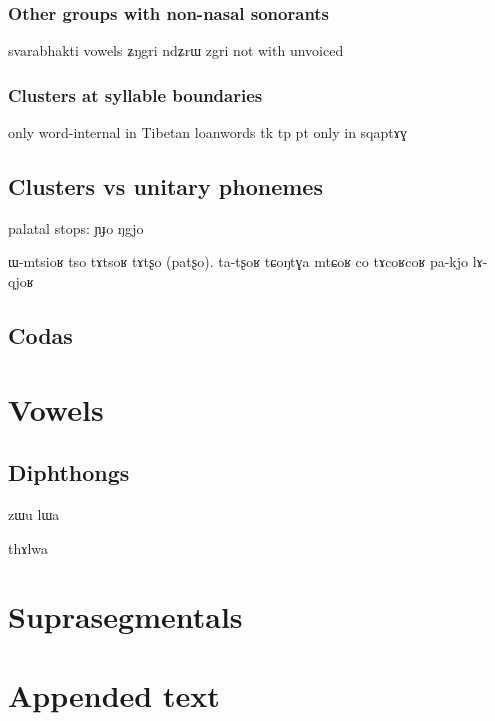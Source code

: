 \documentclass[oldfontcommands,oneside,a4paper,11pt]{article}
\newcommand{\ipa}[1]{{\phon #1}} %
\begin{document}
   \subsubsection{Other groups with non-nasal sonorants } \label{sec:other.non.medial}
  
 svarabhakti vowels \ipa{ʑŋgri} \ipa{ndʑrɯ} \ipa{zgri} not with unvoiced
 
 
 
 \subsubsection{Clusters at syllable boundaries}
 only word-internal in Tibetan loanwords tk tp 
 pt only in \ipa{sqaptɤɣ}
 
 
      \subsection{Clusters vs unitary phonemes} \label{sec:non.clusters}
      
      
palatal stops:      
      \ipa{ɲɟo} \ipa{ŋgjo}
      
      ɯ-mtsioʁ
	tso tɤtsoʁ 
	tɤtʂo (patʂo). ta-tʂoʁ
 tɕoŋtɣa mtɕoʁ
 co tɤcoʁcoʁ
 pa-kjo
     lɤ-qjoʁ
      \subsection{Codas} \label{sec:coda}
    
    
     \section{Vowels} \label{sec:vowels}
     
          \subsection{Diphthongs}
     zɯu
     lɯa
     
     thɤlwa
     
     \section{Suprasegmentals}
     
         
     \section{Appended text}


\end{document}

